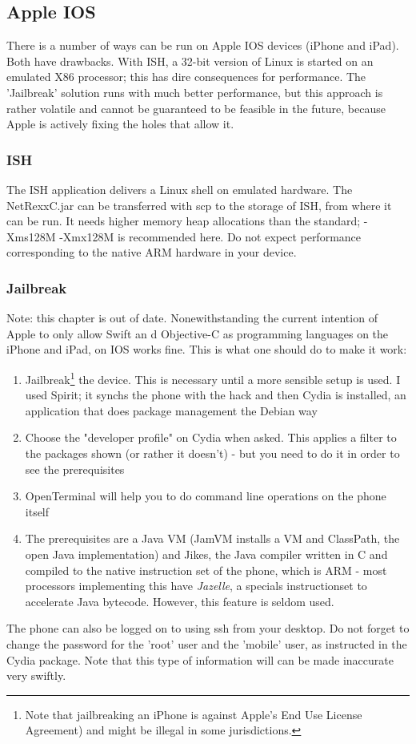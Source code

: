 {\subsection{Apple IOS}
There is a number of ways \nr{} can be run on Apple IOS devices
(iPhone and iPad). Both have drawbacks. With ISH, a 32-bit version of
Linux is started on an emulated X86 processor; this has dire
consequences for performance. The 'Jailbreak' solution runs with much
better performance, but this approach is rather volatile and cannot be
guaranteed to be feasible in the future, because Apple is actively
fixing the holes that allow it.
\subsubsection{ISH}
The ISH application delivers a Linux shell on emulated hardware. The
NetRexxC.jar can be transferred with scp to the storage of ISH, from
where it can be run. It needs higher memory heap allocations than the
standard; -Xms128M -Xmx128M is recommended here. Do not expect
performance corresponding to the native ARM hardware in your device.
\subsubsection{Jailbreak}
Note: this chapter is out of date. 
Nonewithstanding the current intention of Apple to only allow Swift an
d Objective-C
as programming languages on the iPhone and iPad, \nr{} on IOS works fine. This is what one should do to make it work:
\begin{enumerate}
\item Jailbreak\footnote{Note that jailbreaking an iPhone is against Apple's End Use License Agreement) and might be illegal in some jurisdictions.} the device. This is necessary until a more sensible setup is used. I used Spirit; it synchs the phone with the hack and then Cydia is installed, an application that does package management the Debian way
\item Choose the "developer profile" on Cydia when asked. This applies a filter to the packages shown (or rather it doesn't) - but you need to do it in order to see the prerequisites
\item OpenTerminal will help you to do command line operations on the phone itself
\item The prerequisites are a Java VM (JamVM installs a VM and
  ClassPath, the open Java implementation) and Jikes, the Java
  compiler written in C and compiled to the native instruction set of
  the phone, which is ARM - most processors implementing this have
  \emph{Jazelle}, a specials instructionset to accelerate Java
  bytecode. However, this feature is seldom used. 
\end{enumerate}
The phone can also be logged on to using ssh from your desktop. Do not forget to change the password for the 'root' user and the 'mobile' user, as instructed in the Cydia package. Note that this type of information will can be made inaccurate very swiftly.

}
